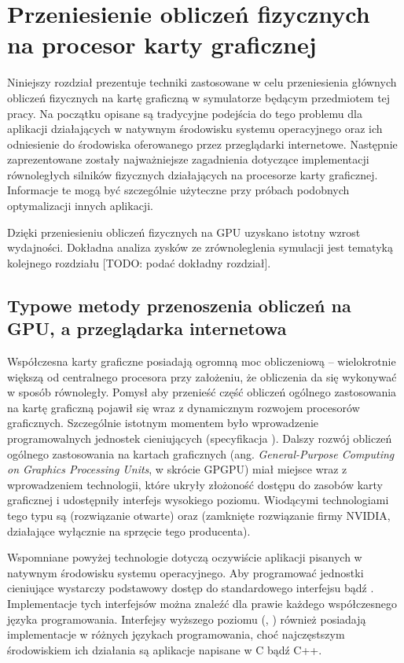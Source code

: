 \chapter{Przeniesienie obliczeń fizycznych na procesor karty graficznej}

Niniejszy rozdział prezentuje techniki zastosowane w celu przeniesienia głównych
obliczeń fizycznych na kartę graficzną w symulatorze  będącym
przedmiotem tej pracy. Na początku opisane są tradycyjne podejścia do tego
problemu dla aplikacji działających w natywnym środowisku systemu operacyjnego
oraz ich odniesienie do środowiska oferowanego przez przeglądarki internetowe.
Następnie zaprezentowane zostały najważniejsze zagadnienia dotyczące
implementacji równoległych silników fizycznych  działających na
procesorze karty graficznej. Informacje te mogą być szczególnie użyteczne przy
próbach podobnych optymalizacji innych aplikacji.

Dzięki przeniesieniu obliczeń fizycznych na GPU uzyskano istotny wzrost
wydajności. Dokładna analiza zysków ze zrównoleglenia symulacji jest tematyką
kolejnego rozdziału [TODO: podać dokładny rozdział].

\section{Typowe metody przenoszenia obliczeń na GPU, a przeglądarka internetowa}

Współczesna karty graficzne posiadają ogromną moc obliczeniową -- wielokrotnie
większą od centralnego procesora przy założeniu, że obliczenia da się wykonywać
w sposób równoległy. Pomysł aby przenieść część obliczeń ogólnego zastosowania
na kartę graficzną pojawił się wraz z dynamicznym rozwojem procesorów
graficznych. Szczególnie istotnym momentem było wprowadzenie programowalnych
jednostek cieniujących (specyfikacja ). Dalszy rozwój obliczeń
ogólnego zastosowania na kartach graficznych (ang. \emph{General-Purpose
Computing on Graphics Processing Units}, w skrócie GPGPU) miał miejsce wraz z
wprowadzeniem technologii, które ukryły złożoność dostępu do zasobów karty
graficznej i udostępniły interfejs wysokiego poziomu. Wiodącymi technologiami
tego typu są  (rozwiązanie otwarte) oraz  (zamknięte
rozwiązanie firmy NVIDIA, działające wyłącznie na sprzęcie tego producenta).

Wspomniane powyżej technologie dotyczą oczywiście aplikacji pisanych w natywnym
środowisku systemu operacyjnego. Aby programować jednostki cieniujące wystarczy
podstawowy dostęp do standardowego interfejsu  bądź .
Implementacje tych interfejsów można znaleźć dla prawie każdego współczesnego
języka programowania. Interfejsy wyższego poziomu (, )
również posiadają implementacje w różnych językach programowania, choć
najczęstszym środowiskiem ich działania są aplikacje napisane w C bądź C++.

